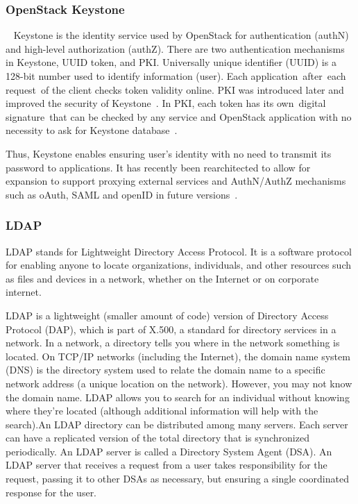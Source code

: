 {\subsubsection{OpenStack Keystone \cv}
~\cite{www-keystone-wiki} Keystone is the identity service used by
OpenStack for authentication (authN) and high-level authorization
(authZ).  There are two authentication mechanisms in Keystone, UUID
token, and PKI.  Universally unique identifier (UUID) is a 128-bit
number used to identify information (user). Each
application after each request of the client checks token validity
online. PKI was introduced later and improved the security of
Keystone~\cite{cui2015security}. In PKI, each token has its
own digital signature that can be checked by any service and OpenStack
application with no necessity to ask for Keystone
database~\cite{www-cloudberrylab-kstn}.
 
Thus, Keystone enables ensuring user’s identity with no need to
transmit its password to applications. It has recently been
rearchitected to allow for expansion to support proxying external
services and AuthN/AuthZ mechanisms such as oAuth, SAML and openID in
future versions~\cite{www-keystone}.

\subsubsection{LDAP}

LDAP stands for Lightweight Directory Access Protocol. It is a
software protocol for enabling anyone to locate organizations,
individuals, and other resources such as files and devices in a
network, whether on the Internet or on corporate
internet.~\cite{www-ldap}

     LDAP is a lightweight (smaller amount of code) version of
     Directory Access Protocol (DAP), which is part of X.500, a
     standard for directory services in a network.  In a network, a
     directory tells you where in the network something is located. On
     TCP/IP networks (including the Internet), the domain name system
     (DNS) is the directory system used to relate the domain name to a
     specific network address (a unique location on the
     network). However, you may not know the domain name. LDAP allows
     you to search for an individual without knowing where they're
     located (although additional information will help with the
     search).An LDAP directory can be distributed among many
     servers. Each server can have a replicated version of the total
     directory that is synchronized periodically.  An LDAP server is
     called a Directory System Agent (DSA). An LDAP server that
     receives a request from a user takes responsibility for the
     request, passing it to other DSAs as necessary, but ensuring a
     single coordinated response for the user.

}
